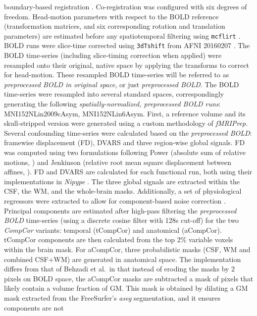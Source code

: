 \documentclass[]{article}
\begin{document}
\begin{description}
boundary-based registration \citep{bbr}. Co-registration was configured
with six degrees of freedom. Head-motion parameters with respect to the
BOLD reference (transformation matrices, and six corresponding rotation
and translation parameters) are estimated before any spatiotemporal
filtering using \texttt{mcflirt} \citep[FSL 5.0.9,][]{mcflirt}. BOLD
runs were slice-time corrected using \texttt{3dTshift} from AFNI
20160207 \citep[RRID:SCR\_005927]{afni}. The BOLD time-series (including
slice-timing correction when applied) were resampled onto their
original, native space by applying the transforms to correct for
head-motion. These resampled BOLD time-series will be referred to as
\emph{preprocessed BOLD in original space}, or just \emph{preprocessed
BOLD}. The BOLD time-series were resampled into several standard spaces,
correspondingly generating the following \emph{spatially-normalized,
preprocessed BOLD runs}: MNI152NLin2009cAsym, MNI152NLin6Asym. First, a
reference volume and its skull-stripped version were generated using a
custom methodology of \emph{fMRIPrep}. Several confounding time-series
were calculated based on the \emph{preprocessed BOLD}: framewise
displacement (FD), DVARS and three region-wise global signals. FD was
computed using two formulations following Power (absolute sum of
relative motions, \citet{power_fd_dvars}) and Jenkinson (relative root
mean square displacement between affines, \citet{mcflirt}). FD and DVARS
are calculated for each functional run, both using their implementations
in \emph{Nipype} \citep[following the definitions by][]{power_fd_dvars}.
The three global signals are extracted within the CSF, the WM, and the
whole-brain masks. Additionally, a set of physiological regressors were
extracted to allow for component-based noise correction
\citep[\emph{CompCor},][]{compcor}. Principal components are estimated
after high-pass filtering the \emph{preprocessed BOLD} time-series
(using a discrete cosine filter with 128s cut-off) for the two
\emph{CompCor} variants: temporal (tCompCor) and anatomical (aCompCor).
tCompCor components are then calculated from the top 2\% variable voxels
within the brain mask. For aCompCor, three probabilistic masks (CSF, WM
and combined CSF+WM) are generated in anatomical space. The
implementation differs from that of Behzadi et al.~in that instead of
eroding the masks by 2 pixels on BOLD space, the aCompCor masks are
subtracted a mask of pixels that likely contain a volume fraction of GM.
This mask is obtained by dilating a GM mask extracted from the
FreeSurfer's \emph{aseg} segmentation, and it ensures components are not

\end{description}
\end{document}
